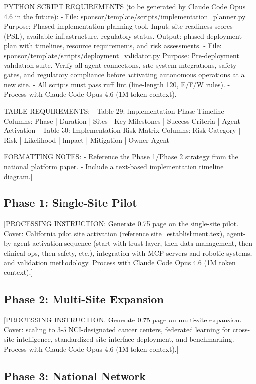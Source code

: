 PYTHON SCRIPT REQUIREMENTS (to be generated by Claude Code Opus 4.6 in the future):
- File: sponsor/template/scripts/implementation\_planner.py
  Purpose: Phased implementation planning tool. Input: site readiness scores
  (PSL), available infrastructure, regulatory status. Output: phased deployment
  plan with timelines, resource requirements, and risk assessments.
- File: sponsor/template/scripts/deployment\_validator.py
  Purpose: Pre-deployment validation suite. Verify all agent connections, site
  system integrations, safety gates, and regulatory compliance before
  activating autonomous operations at a new site.
- All scripts must pass ruff lint (line-length 120, E/F/W rules).
- Process with Claude Code Opus 4.6 (1M token context).

TABLE REQUIREMENTS:
- Table 29: Implementation Phase Timeline
  Columns: Phase | Duration | Sites | Key Milestones | Success Criteria | Agent Activation
- Table 30: Implementation Risk Matrix
  Columns: Risk Category | Risk | Likelihood | Impact | Mitigation | Owner Agent

FORMATTING NOTES:
- Reference the Phase 1/Phase 2 strategy from the national platform paper.
- Include a text-based implementation timeline diagram.]

\subsection{Phase 1: Single-Site Pilot}

[PROCESSING INSTRUCTION: Generate 0.75 page on the single-site pilot. Cover: California
pilot site activation (reference site\_establishment.tex), agent-by-agent activation
sequence (start with trust layer, then data management, then clinical ops, then safety,
etc.), integration with MCP servers and robotic systems, and validation methodology.
Process with Claude Code Opus 4.6 (1M token context).]

\subsection{Phase 2: Multi-Site Expansion}

[PROCESSING INSTRUCTION: Generate 0.75 page on multi-site expansion. Cover: scaling to
3-5 NCI-designated cancer centers, federated learning for cross-site intelligence,
standardized site interface deployment, and benchmarking.
Process with Claude Code Opus 4.6 (1M token context).]

\subsection{Phase 3: National Network}

